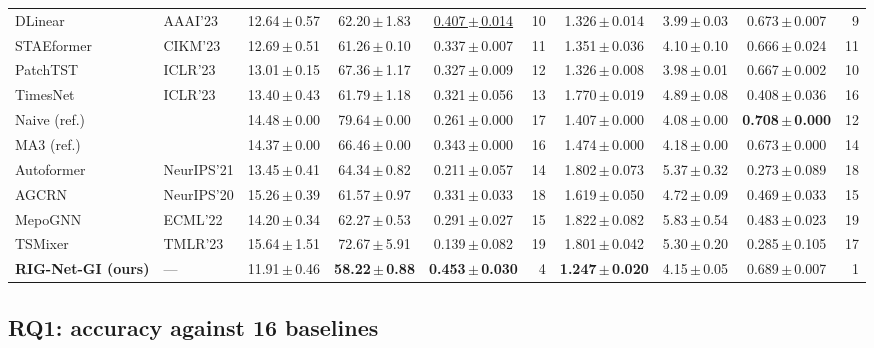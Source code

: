 \documentclass[conference]{IEEEtran}
\begin{document}
\begin{table}[t]
\begin{tabular}{llcccr@{\hskip 8pt}cccr}
DLinear & AAAI'23 & 12.64\,$\pm$\,0.57 & 62.20\,$\pm$\,1.83 & \underline{0.407\,$\pm$\,0.014} & 10 & 1.326\,$\pm$\,0.014 & 3.99\,$\pm$\,0.03 & 0.673\,$\pm$\,0.007 & 9 \\
STAEformer & CIKM'23 & 12.69\,$\pm$\,0.51 & 61.26\,$\pm$\,0.10 & 0.337\,$\pm$\,0.007 & 11 & 1.351\,$\pm$\,0.036 & 4.10\,$\pm$\,0.10 & 0.666\,$\pm$\,0.024 & 11 \\
PatchTST & ICLR'23 & 13.01\,$\pm$\,0.15 & 67.36\,$\pm$\,1.17 & 0.327\,$\pm$\,0.009 & 12 & 1.326\,$\pm$\,0.008 & 3.98\,$\pm$\,0.01 & 0.667\,$\pm$\,0.002 & 10 \\
TimesNet & ICLR'23 & 13.40\,$\pm$\,0.43 & 61.79\,$\pm$\,1.18 & 0.321\,$\pm$\,0.056 & 13 & 1.770\,$\pm$\,0.019 & 4.89\,$\pm$\,0.08 & 0.408\,$\pm$\,0.036 & 16 \\
Naive (ref.) & \cite{hyndman2006} & 14.48\,$\pm$\,0.00 & 79.64\,$\pm$\,0.00 & 0.261\,$\pm$\,0.000 & 17 & 1.407\,$\pm$\,0.000 & 4.08\,$\pm$\,0.00 & \textbf{0.708\,$\pm$\,0.000} & 12 \\
MA3 (ref.) & \cite{hyndman2006} & 14.37\,$\pm$\,0.00 & 66.46\,$\pm$\,0.00 & 0.343\,$\pm$\,0.000 & 16 & 1.474\,$\pm$\,0.000 & 4.18\,$\pm$\,0.00 & 0.673\,$\pm$\,0.000 & 14 \\
Autoformer & NeurIPS'21 & 13.45\,$\pm$\,0.41 & 64.34\,$\pm$\,0.82 & 0.211\,$\pm$\,0.057 & 14 & 1.802\,$\pm$\,0.073 & 5.37\,$\pm$\,0.32 & 0.273\,$\pm$\,0.089 & 18 \\
AGCRN & NeurIPS'20 & 15.26\,$\pm$\,0.39 & 61.57\,$\pm$\,0.97 & 0.331\,$\pm$\,0.033 & 18 & 1.619\,$\pm$\,0.050 & 4.72\,$\pm$\,0.09 & 0.469\,$\pm$\,0.033 & 15 \\
MepoGNN & ECML'22 & 14.20\,$\pm$\,0.34 & 62.27\,$\pm$\,0.53 & 0.291\,$\pm$\,0.027 & 15 & 1.822\,$\pm$\,0.082 & 5.83\,$\pm$\,0.54 & 0.483\,$\pm$\,0.023 & 19 \\
TSMixer & TMLR'23 & 15.64\,$\pm$\,1.51 & 72.67\,$\pm$\,5.91 & 0.139\,$\pm$\,0.082 & 19 & 1.801\,$\pm$\,0.042 & 5.30\,$\pm$\,0.20 & 0.285\,$\pm$\,0.105 & 17 \\
\midrule
\textbf{RIG-Net-GI (ours)} & --- & 11.91\,$\pm$\,0.46 & \textbf{58.22\,$\pm$\,0.88} & \textbf{0.453\,$\pm$\,0.030} & 4 & \textbf{1.247\,$\pm$\,0.020} & 4.15\,$\pm$\,0.05 & 0.689\,$\pm$\,0.007 & 1 \\
\bottomrule
\end{tabular}
\end{table}

\subsection{RQ1: accuracy against 16 baselines}
\end{document}
